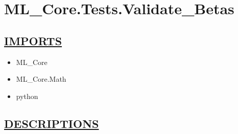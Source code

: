 \chapter*{ML\_Core.Tests.Validate\_Betas}
\hypertarget{ecldoc:toc:ML_Core.Tests.Validate_Betas}{}

\section*{\underline{IMPORTS}}
\begin{itemize}
\item ML\_Core
\item ML\_Core.Math
\item python
\end{itemize}

\section*{\underline{DESCRIPTIONS}}
